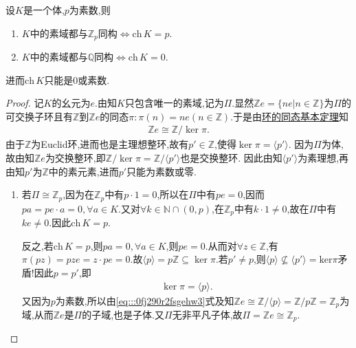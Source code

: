 \documentclass[../../main.tex]{subfiles}%
\begin{document}
\begin{theorem}\label{theorem:抽象代数--定理3.1.2}
设$K$是一个体,$p$为素数,则
\begin{enumerate}[(1)]
\item $K\text{中的素域都与}\mathbb{Z} _p\text{同构}\Longleftrightarrow \mathrm{ch}\,K=p$.

\item $K\text{中的素域都与}\mathbb{Q} \text{同构}\Longleftrightarrow \mathrm{ch}\,K=0$.
\end{enumerate}
进而$\mathrm{ch}\,K$只能是$0$或素数.
\end{theorem}
\begin{proof}

记$K$的幺元为$e$.由知$K$只包含唯一的素域,记为$\Pi$.显然$\mathbb{Z}e=\{ne|n\in\mathbb{Z}\}$为$\Pi$的可交换子环且有$\mathbb{Z}$到$\mathbb{Z}e$的同态$\pi:\pi(n)=ne(n\in\mathbb{Z})$.于是由\hyperref[theorem:环的同态基本定理]{环的同态基本定理}知
\begin{align}\label{eq:::0fj290r2fsgehw3}
\mathbb{Z}e\cong \mathbb{Z}/\ker\pi.
\end{align}
由于$\mathbb{Z}$为Euclid环,进而也是主理想整环,故有$p'\in \mathbb{Z}$,使得$\ker\pi=\langle p'\rangle $.
因为$\Pi$为体,故由知$\mathbb{Z}e$为交换整环,即$\mathbb{Z}/\ker\pi=\mathbb{Z}/\langle p'\rangle$也是交换整环.
因此由知$\langle p'\rangle$为素理想,再由知$p'$为$\mathbb{Z}$中的素元素,进而$p'$只能为素数或零.
\begin{enumerate}[(1)]
\item 若$\Pi\cong\mathbb{Z}_p$,因为在$\mathbb{Z}_p$中有$p\cdot 1=0$,所以在$\Pi$中有$pe=0$,因而$pa=pe\cdot a=0,\forall a\in K$.又对$\forall k\in \mathbb{N}\cap (0,p)$,在$\mathbb{Z}_p$中有$k\cdot 1\neq 0$,故在$\Pi$中有$ke\neq 0$.因此$\text{ch}\,K=p.$

反之,若$\text{ch}\,K=p$,则$pa=0,\forall a\in K$,则$pe=0$.从而对$\forall z\in \mathbb{Z}$,有$\pi \left( pz \right) =pze=z\cdot pe =0$.故$\langle p\rangle=p\mathbb{Z}\subseteq \ker \pi.$若$p'\neq p$,则$\langle p\rangle \nsubseteq \langle p' \rangle =\mathrm{ker}\pi $矛盾!因此$p=p'$,即
\begin{align*}
\ker \pi =\langle p\rangle.
\end{align*}
又因为$p$为素数,所以由\eqref{eq:::0fj290r2fsgehw3}式及知$\mathbb{Z}e\cong \mathbb{Z}/\langle p\rangle=\mathbb{Z}/p\mathbb{Z} = \mathbb{Z}_p$为域,从而$\mathbb{Z}e$是$\Pi$的子域,也是子体.又$\Pi$无非平凡子体,故$\Pi=\mathbb{Z}e\cong\mathbb{Z}_p$.


\end{enumerate}
\end{proof}
\end{document}
